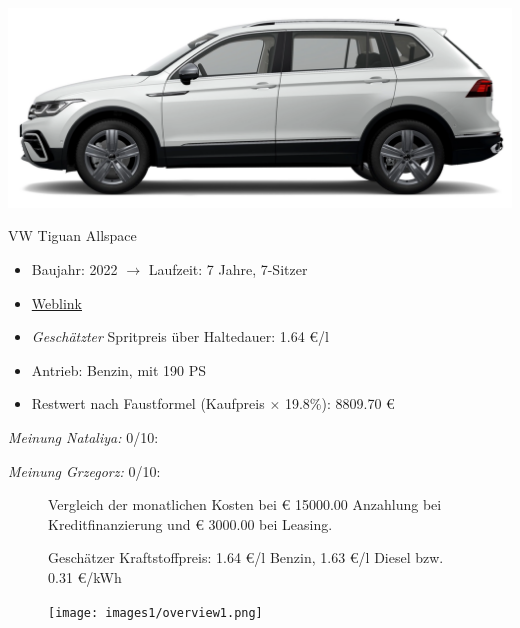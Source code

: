 \documentclass[landscape, DIV=99, 14pt]{scrartcl}
\begin{document}
\pagebreak
\begin{center}
\includegraphics[width=0.9\columnwidth]{cars/vw-tiguan-diesel.png}

VW Tiguan Allspace
\end{center}

\begin{itemize}
    \item Baujahr: 2022 $\rightarrow$ Laufzeit: 7 Jahre, 7-Sitzer
    \item \href{https://www.volkswagen.de/de/konfigurator.html/__app/der-neue-tiguan-allspace/der-tiguan-allspace---standardmodelle/elegance.app?buildabilityStatus-app=buildable&category-app=private&carlineId-app=31160&salesGroupId-app=32700&trimName-app=Elegance&modelId-app=BJ247T%24GYORYOR&modelVersion-app=2&modelYear-app=2022&exteriorId-app=F14+0Q0Q&interiorId-app=F56+++++BG&options-app=GWBAWBA-GPG4PG4-MAHV1M6-GPFCPFC-GRBDRBD-MKSUKA2}{Weblink}
    \item \emph{Gesch\"atzter} Spritpreis \"uber Haltedauer: 1.64 \euro{}/l
    \item Antrieb: Benzin, mit 190 PS
    \item Restwert nach Faustformel (Kaufpreis $\times$ 19.8\%): 8809.70 \euro{}
\end{itemize}

\begin{small}
\emph{Meinung Nataliya:} 0/10: 
        
\emph{Meinung Grzegorz:} 0/10: 
\end{small}

\pagebreak



\pagebreak

\onecolumn
\begin{figure}
\centering
Vergleich der monatlichen Kosten bei \euro{} 15000.00 Anzahlung bei Kreditfinanzierung und \euro{} 3000.00 bei Leasing.

Gesch\"atzer Kraftstoffpreis: 1.64 \euro{}/l Benzin, 1.63 \euro{}/l Diesel bzw. 0.31 \euro{}/kWh


\vspace{1em}
\texttt{[image: images1/overview1.png]}
\end{figure}
\vfill 
\end{document}
